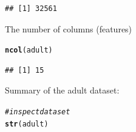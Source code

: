 \documentclass[10pt  ,usenames, dvipsnames]{article}\usepackage[]{graphicx}\usepackage[]{color}
\makeatletter
\newcommand{\hlcom}[1]{\textcolor[rgb]{0.678,0.584,0.686}{\textit{#1}}}%
\newcommand{\hlstd}[1]{\textcolor[rgb]{0.345,0.345,0.345}{#1}}%
\newcommand{\hlkwd}[1]{\textcolor[rgb]{0.737,0.353,0.396}{\textbf{#1}}}%
\newenvironment{kframe}{%
 \def\at@end@of@kframe{}%
 \ifinner\ifhmode%
  \def\at@end@of@kframe{\end{minipage}}%
  \begin{minipage}{\columnwidth}%
 \fi\fi%
 \def\FrameCommand##1{\hskip\@totalleftmargin \hskip-\fboxsep
 \colorbox{shadecolor}{##1}\hskip-\fboxsep
     \hskip-\linewidth \hskip-\@totalleftmargin \hskip\columnwidth}%
 \MakeFramed {\advance\hsize-\width
   \@totalleftmargin\z@ \linewidth\hsize
   \@setminipage}}%
 {\par\unskip\endMakeFramed%
 \at@end@of@kframe}
\newenvironment{knitrout}{}{} %
\makeatother
\begin{document}
\begin{knitrout}
\color{fgcolor}\begin{kframe}
\begin{verbatim}
## [1] 32561
\end{verbatim}
\end{kframe}
\end{knitrout}

The number of columns (features)

\begin{knitrout}
\color{fgcolor}\begin{kframe}
\begin{alltt}
\hlkwd{ncol}\hlstd{(adult)}
\end{alltt}
\end{kframe}
\end{knitrout}

\begin{knitrout}
\color{fgcolor}\begin{kframe}
\begin{verbatim}
## [1] 15
\end{verbatim}
\end{kframe}
\end{knitrout}

Summary of the adult dataset:

\begin{knitrout}
\color{fgcolor}\begin{kframe}
\begin{alltt}
\hlcom{#inspect dataset}
\hlkwd{str}\hlstd{(adult)}
\end{alltt}
\end{kframe}
\end{knitrout}
\end{document}
